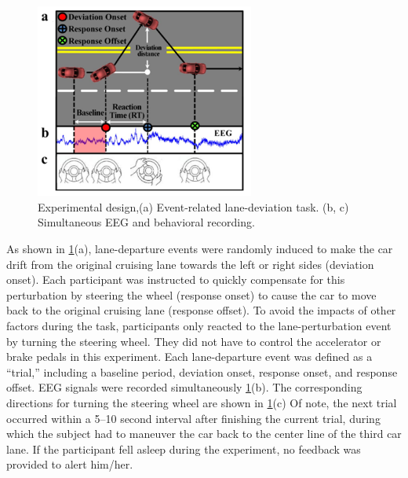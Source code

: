 \documentclass{IEEE_lsens}
\begin{document}
\begin{figure}[t!]
\centering
\includegraphics[width=7.2cm,keepaspectratio=true]{Fig_data_scenario.png}
\vspace{-0.2cm}
\caption{\scriptsize Experimental design,(a)	Event-related lane-deviation task. (b, c) Simultaneous EEG and behavioral recording.
\label{Fig_data_scenario}}
\vspace{-0.3cm}
\end{figure}
As shown in \ref{Fig_data_scenario}(a), lane-departure events were randomly induced to make the car drift from the original cruising lane towards the left or right sides (deviation onset). Each participant was instructed to quickly compensate for this perturbation by steering the wheel (response onset) to cause the car to move back to the original cruising lane (response offset). To avoid the impacts of other factors during the task, participants only reacted to the lane-perturbation event by turning the steering wheel. They did not have to control the accelerator or brake pedals in this experiment. Each lane-departure event was defined as a “trial,” including a baseline period, deviation onset, response onset, and response offset. EEG signals were recorded simultaneously \ref{Fig_data_scenario}(b).
The corresponding directions for turning the steering wheel are shown in \ref{Fig_data_scenario}(c) Of note, the next trial occurred within a 5–10 second interval after finishing the current trial, during which the subject had to maneuver the car back to the center line of the third car lane. If the participant fell asleep during the experiment, no feedback was provided to alert him/her.
\end{document}
